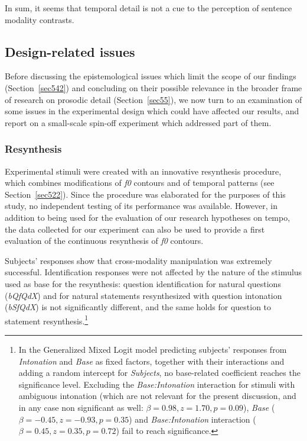 In sum, it seems that temporal detail is not a cue to the perception of sentence modality contrasts.

\subsection{Design-related issues}\label{sec541}
Before discussing the epistemological issues which limit the scope of our findings (Section~\ref{sec542}) and concluding on their possible relevance in the broader frame of research on prosodic detail (Section~\ref{sec55}), we now turn to an examination of some issues in the experimental design which could have affected our results, and report on a small-scale spin-off experiment which addressed part of them.

\subsubsection{Resynthesis}\label{sec5411}
Experimental stimuli were created with an innovative resynthesis procedure, which combines modifications of \textit{f0} contours and of temporal patterns (see Section~\ref{sec522}). Since the procedure was elaborated for the purposes of this study, no independent testing of its performance was available. However, in addition to being used for the evaluation of our research hypotheses on tempo, the data collected for our experiment can also be used to provide a first evaluation of the continuous resynthesis of \textit{f0} contours.

Subjects' responses show that cross-modality manipulation was extremely successful. Identification responses were not affected by the nature of the stimulus used as base for the resynthesis: question identification for natural questions (\textit{bQfQdX}) and for natural statements resynthesized with question intonation (\textit{bSfQdX}) is not significantly different, and the same holds for question to statement resynthesis.\footnote{In the Generalized Mixed Logit model predicting subjects' responses from  \textit{Intonation} and \textit{Base} as fixed factors, together with their interactions and adding a random intercept for \textit{Subjects}, no base-related coefficient reaches the significance level. Excluding the \textit{Base:Intonation} interaction for stimuli with ambiguous intonation (which are not relevant for the present discussion, and in any case non significant as well: $\beta=0.98, z=1.70, p=0.09$), \textit{Base} ($\beta=-0.45, z=-0.93, p=0.35$) and \textit{Base:Intonation} interaction ($\beta=0.45, z=0.35, p=0.72$) fail to reach significance.} 

